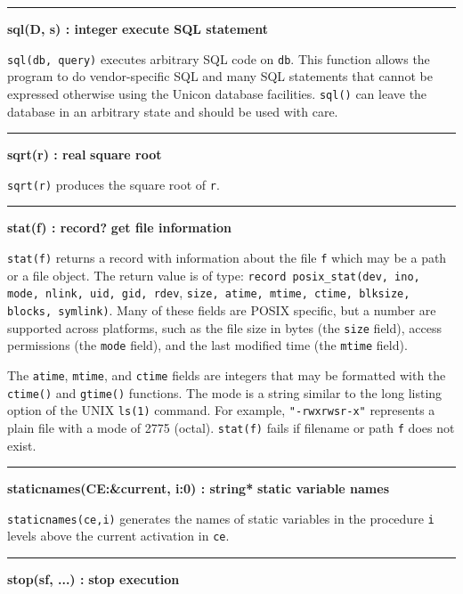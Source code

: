 \bigskip\hrule\vspace{0.1cm}
\noindent
{\bf sql(D, s) : integer } \hfill {\bf execute SQL statement}

\noindent
{}\texttt{sql(db, query)} executes arbitrary SQL code on
\texttt{db}. This function allows the program to do vendor-specific SQL
and many SQL statements that cannot be expressed otherwise using the
Unicon database facilities. \texttt{sql()} can leave the database in an
arbitrary state and should be used with care.

\bigskip\hrule\vspace{0.1cm}
\noindent
{\bf sqrt(r) : real } \hfill {\bf square root}

\noindent
{}\texttt{sqrt(r)} produces the square root of
\texttt{r}.

\bigskip\hrule\vspace{0.1cm}
\noindent
{\bf stat(f) : record? } \hfill {\bf get file information}

\noindent
{}\texttt{stat(f)} returns a record
with information about the file \texttt{f} which may be a path or a
file object. The return value is of type:
\texttt{record posix\_stat(dev, ino, mode, nlink, uid, gid, rdev},
\texttt{size, atime, mtime, ctime, blksize, blocks, symlink)}.
Many of these fields are POSIX
specific, but a number are supported across platforms, such as the
file size in bytes (the \texttt{size} field), access
permissions (the \texttt{mode} field), and the last modified time (the
\texttt{mtime} field).

The \texttt{atime}, \texttt{mtime}, and \texttt{ctime} fields are
integers that may be formatted with the \texttt{ctime()} and
\texttt{gtime()} functions. The mode is a string similar to the long
listing option of the UNIX \texttt{ls(1)} command. For example,
\texttt{"-rwxrwsr-x"} represents a plain
file with a mode of 2775 (octal). \texttt{stat(f)} fails if filename or
path \texttt{f} does not exist.

\bigskip\hrule\vspace{0.1cm}
\noindent
{\bf staticnames(CE:\&current, i:0) : string* } \hfill {\bf static variable names}

\noindent
{}\texttt{staticnames(ce,i)} generates the names of static
variables in the procedure \texttt{i} levels above the current
activation in \texttt{ce}.

\bigskip\hrule\vspace{0.1cm}
\noindent
{\bf stop(s{\textbar}f, ...) : } \hfill {\bf stop execution}

